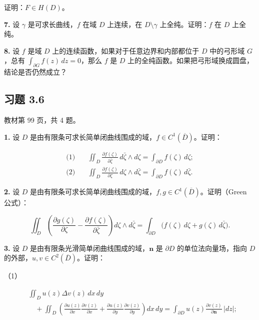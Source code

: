 \documentclass[11pt,a4paper]{article}
\begin{document}
证明：\(F\in H(D)\)。

\par{}
\noindent\textbf{7.} 设 \(\gamma\) 是可求长曲线，\(f\) 在域 \(D\) 上连续，在
\(D\setminus\gamma\) 上全纯。证明：\(f\) 在 \(D\) 上全纯。

\par{}
\noindent\textbf{8.} 设 \(f\) 是域 \(D\)
上的连续函数，如果对于任意边界和内部都位于 \(D\) 中的弓形域 \(G\)，总有
\(\int_{\partial G}f(z)\,dz=0\)，那么 \(f\) 是 \(D\)
上的全纯函数。如果把弓形域换成圆盘，结论是否仍然成立？

\subsection{习题 3.6}\label{ch03-practice-ux4e60ux9898-36}

教材第 99 页，共 4 题。

\par{}
\noindent\textbf{1.} 设 \(D\)
是由有限条可求长简单闭曲线围成的域，\(f\in C^1(\overline D)\)。证明：

\[
\begin{aligned}
\text{(1)}\quad&\iint_D\frac{\partial f(\zeta)}{\partial\bar\zeta}\,d\bar\zeta\wedge d\zeta
=\int_{\partial D}f(\zeta)\,d\zeta;\\
\text{(2)}\quad&\iint_D\frac{\partial f(\zeta)}{\partial\zeta}\,d\zeta\wedge d\bar\zeta
=\int_{\partial D}f(\zeta)\,d\bar\zeta.
\end{aligned}
\]

\par{}
\noindent\textbf{2.} 设 \(D\)
是由有限条可求长简单闭曲线围成的域，\(f,g\in C^1(\overline D)\)。证明（Green
公式）：

\[
\iint_D\left(\frac{\partial g(\zeta)}{\partial\zeta}-\frac{\partial f(\zeta)}{\partial\bar\zeta}\right)d\zeta\wedge d\bar\zeta
=\int_{\partial D}\bigl(f(\zeta)\,d\zeta+g(\zeta)\,d\bar\zeta\bigr).
\]

\par{}
\noindent\textbf{3.} 设 \(D\) 是由有限条光滑简单闭曲线围成的域，\(\boldsymbol n\)
是 \(\partial D\) 的单位法向量场，指向 \(D\)
的外部，\(u,v\in C^2(\overline D)\)。证明：

（1）

\[
\begin{aligned}
&\iint_Du(z)\Delta v(z)\,dx\,dy\\
&\quad+\iint_D\left(\frac{\partial u(z)}{\partial x}\frac{\partial v(z)}{\partial x}
+\frac{\partial u(z)}{\partial y}\frac{\partial v(z)}{\partial y}\right)dx\,dy
=\int_{\partial D}u(z)\frac{\partial v(z)}{\partial\boldsymbol n}\,|dz|;
\end{aligned}
\]
\end{document}
